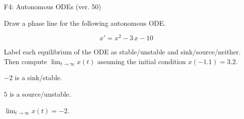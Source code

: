 \begin{exercise}
  \begin{exerciseTitle}F4: Autonomous ODEs (ver. 50)\end{exerciseTitle}
  \begin{exerciseStatement}
    

      Draw a phase line for the following 
      autonomous ODE.
    

    
\[x'= x^{2} - 3 \, x - 10\]

    

      Label each equilibrium of the ODE
      as stable/unstable and sink/source/neither.
      Then compute \(\lim_{t\to\infty}x(t)\)
      assuming the initial condition
      \(x( -1.1 )= 3.2\).
    

  \end{exerciseStatement}
  \begin{exerciseAnswer}
    

      \(-2\) is a sink/stable.
      
      \(5\) is a source/unstable.
    

    

      \(\lim_{t\to\infty}x(t)=-2\).
    

  \end{exerciseAnswer}
\end{exercise}